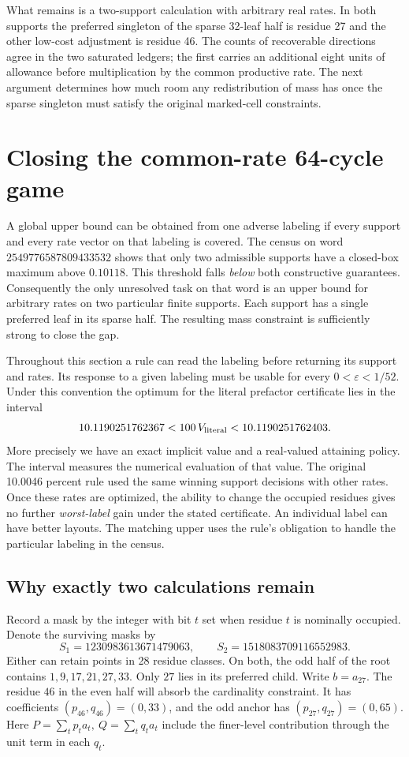 \documentclass[12pt,letterpaper]{article}
\begin{document}
What remains is a two-support calculation with arbitrary real rates. In both supports the preferred singleton of the sparse 32-leaf half is residue 27 and the other low-cost adjustment is residue 46. The counts of recoverable directions agree in the two saturated ledgers; the first carries an additional eight units of allowance before multiplication by the common productive rate. The next argument determines how much room any redistribution of mass has once the sparse singleton must satisfy the original marked-cell constraints.
\section{Closing the common-rate 64-cycle game}
\label{sec:cycle64-endgame}

A global upper bound can be obtained from one adverse labeling if every support and every rate vector on that labeling is covered. The census on word \(2549776587809433532\) shows that only two admissible supports have a closed-box maximum above \(0.10118\). This threshold falls \emph{below} both constructive guarantees. Consequently the only unresolved task on that word is an upper bound for arbitrary rates on two particular finite supports. Each support has a single preferred leaf in its sparse half. The resulting mass constraint is sufficiently strong to close the gap.

Throughout this section a rule can read the labeling before returning its support and rates. Its response to a given labeling must be usable for every \(0<\varepsilon<1/52\). Under this convention the optimum for the literal prefactor certificate lies in the interval
\[
 10.1190251762367
 <100\,V_{\rm literal}<
 10.1190251762403 .
\]
More precisely we have an exact implicit value and a real-valued attaining policy. The interval measures the numerical evaluation of that value. The original 10.0046 percent rule used the same winning support decisions with other rates. Once these rates are optimized, the ability to change the occupied residues gives no further \emph{worst-label} gain under the stated certificate. An individual label can have better layouts. The matching upper uses the rule's obligation to handle the particular labeling in the census.

\subsection{Why exactly two calculations remain}

Record a mask by the integer with bit \(t\) set when residue \(t\) is nominally occupied. Denote the surviving masks by
\[
 S_1=1230983613671479063,\qquad S_2=1518083709116552983 .
\]
Either can retain points in 28 residue classes. On both, the odd half of the root contains \(1,9,17,21,27,33\). Only \(27\) lies in its preferred child. Write \(b=a_{27}\). The residue \(46\) in the even half will absorb the cardinality constraint. It has coefficients \((p_{46},q_{46})=(0,33)\), and the odd anchor has \((p_{27},q_{27})=(0,65)\). Here \(P=\sum_t p_t a_t,\ Q=\sum_t q_t a_t\) include the finer-level contribution through the unit term in each \(q_t\).
\end{document}
